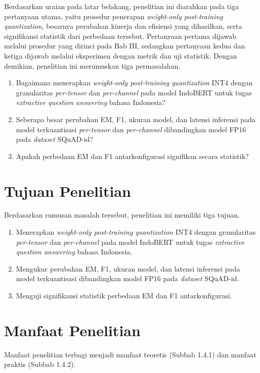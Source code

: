Berdasarkan uraian pada latar belakang, penelitian ini diarahkan pada tiga pertanyaan utama, yaitu prosedur penerapan \textit{weight-only post-training quantization}, besarnya perubahan kinerja dan efisiensi yang dihasilkan, serta signifikansi statistik dari perbedaan tersebut. Pertanyaan pertama dijawab melalui prosedur yang dirinci pada Bab III, sedangkan pertanyaan kedua dan ketiga dijawab melalui eksperimen dengan metrik dan uji statistik. Dengan demikian, penelitian ini merumuskan tiga permasalahan.
\begin{enumerate}
    \item Bagaimana menerapkan \textit{weight-only post-training quantization} INT4 dengan granularitas \textit{per-tensor} dan \textit{per-channel} pada model IndoBERT untuk tugas \textit{extractive question answering} bahasa Indonesia?
    \item Seberapa besar perubahan EM, F1, ukuran model, dan latensi inferensi pada model terkuantisasi \textit{per-tensor} dan \textit{per-channel} dibandingkan model FP16 pada \textit{dataset} SQuAD-id?
    \item Apakah perbedaan EM dan F1 antarkonfigurasi signifikan secara statistik?
\end{enumerate}

\section{Tujuan Penelitian}

Berdasarkan rumusan masalah tersebut, penelitian ini memiliki tiga tujuan.
\begin{enumerate}
    \item Menerapkan \textit{weight-only post-training quantization} INT4 dengan granularitas \textit{per-tensor} dan \textit{per-channel} pada model IndoBERT untuk tugas \textit{extractive question answering} bahasa Indonesia.
    \item Mengukur perubahan EM, F1, ukuran model, dan latensi inferensi pada model terkuantisasi dibandingkan model FP16 pada \textit{dataset} SQuAD-id.
    \item Menguji signifikansi statistik perbedaan EM dan F1 antarkonfigurasi.
\end{enumerate}

\section{Manfaat Penelitian}

Manfaat penelitian terbagi menjadi manfaat teoretis (Subbab 1.4.1) dan manfaat praktis (Subbab 1.4.2).

